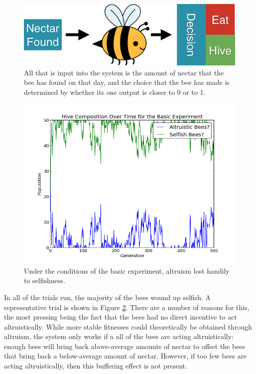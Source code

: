 \documentclass[twoside]{article}
\begin{document}
\begin{multicols}{2}
			\begin{figure}[H]
				\begin{center}
					\includegraphics[width=.4\textwidth]{bee_diagrams/naive_system.png}
				\end{center}
				\caption{All that is input into the system is the amount of nectar that the bee has found on that day, and the choice that the bee has made is determined by whether its one output is closer to 0 or to 1.}
				\label{fig:naive_system}
			\end{figure}

			\begin{figure}[H]
				\begin{center}
					\includegraphics[width=.5\textwidth]{results/basic_comp.png}
				\end{center}
				\caption{Under the conditions of the basic experiment, altruism lost handily to selfishness.}
				\label{fig:basic_experiment_composition}
			\end{figure}

			In all of the trials run, the majority of the bees wound up selfish. A representative trial is shown in Figure \ref{fig:basic_experiment_composition}. There are a number of reasons for this, the most pressing being the fact that the bees had no direct incentive to act altruistically. While more stable fitnesses could theoretically be obtained through altruism, the system only works if a all of the bees are acting altruistically: enough bees will bring back above-average amounts of nectar to offset the bees that bring back a below-average amount of nectar. However, if too few bees are acting altruistically, then this buffering effect is not present. 



\end{multicols}
\end{document}
